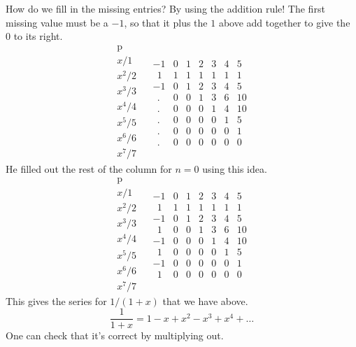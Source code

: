 \documentclass[11pt, oneside]{article}
\begin{document}
How do we fill  in the missing entries?  By using the addition rule!  The first missing value must be a $-1$, so that it plus the $1$ above add together to give the $0$ to its right.
\[
\begin{matrix}
\text{p}  \\
x/1  \\
x^2/2 \\
x^3/3 \\
x^4/4 \\
x^5/5 \\
x^6/6 \\
x^7/7
\end{matrix} \ \ \ \
\begin{matrix}
-1 & 0 & 1 & 2 & 3 & 4 & 5  \\
\ \ 1 & 1 & 1 & 1 & 1 & 1 & 1  \\
-1 & 0 & 1 & 2 & 3 & 4 & 5 \\
\ \ . & 0 & 0 & 1 & 3 & 6 & 10 \\
\ \ . & 0 & 0 & 0 & 1 & 4 & 10 \\
\ \ . & 0 & 0 & 0 & 0 & 1 & 5 \\
\ \ . & 0 & 0 & 0 & 0 & 0 & 1 \\
\ \ . & 0 & 0 & 0 & 0 & 0 & 0
\end{matrix}
\]
He filled out the rest of the column for $n=0$ using this idea.  
\[
\begin{matrix}
\text{p}  \\
x/1  \\
x^2/2 \\
x^3/3 \\
x^4/4 \\
x^5/5 \\
x^6/6 \\
x^7/7
\end{matrix} \ \ \ \
\begin{matrix}
-1 & 0 & 1 & 2 & 3 & 4 & 5  \\
\ \ 1 & 1 & 1 & 1 & 1 & 1 & 1  \\
-1 & 0 & 1 & 2 & 3 & 4 & 5 \\
\ \ 1 & 0 & 0 & 1 & 3 & 6 & 10 \\
-1 & 0 & 0 & 0 & 1 & 4 & 10 \\
\ \ 1 & 0 & 0 & 0 & 0 & 1 & 5 \\
-1 & 0 & 0 & 0 & 0 & 0 & 1 \\
\ \ 1 & 0 & 0 & 0 & 0 & 0 & 0
\end{matrix}
\]
This gives the series for $1/(1+x)$ that we have above.  
\[ \frac{1}{1+x} = 1 - x + x^2 - x^3 + x^4 + \dots  \]
One can check that it's correct by multiplying out.
\end{document}
